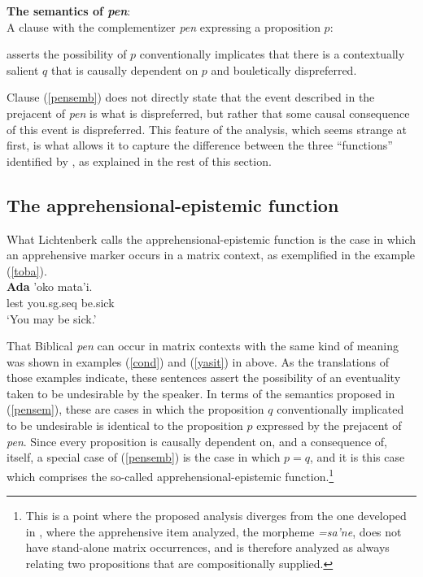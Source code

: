 \documentclass[output=paper,colorlinks,citecolor=brown]{langscibook}
\begin{document}
\ea
\label{pensem} \textnormal{\textbf{The semantics of \textit{pen}}:} \\
\textnormal{A clause with the complementizer \textit{pen} expressing a proposition $p$:}
\begin{xlist}\itemsep=-1mm
\ex\label{pensema} \textnormal{asserts the possibility of $p$}
\ex\label{pensemb} \textnormal{conventionally implicates that there is a contextually salient $q$ that is causally dependent on $p$ and bouletically dispreferred.}
\end{xlist}
\z

\noindent Clause (\ref{pensemb}) does not directly state that the event described in the prejacent of \textit{pen} is what is dispreferred, but rather that some causal consequence of this event is dispreferred. This feature of the analysis, which  seems strange at first, is  what allows it to capture the difference between the three ``functions'' identified by \citet{lichtenberk95}, as explained in the rest of this section. 

\subsection{The apprehensional-epistemic function}
\label{subsec:appr-epis}
What Lichtenberk calls the apprehensional-epistemic function is the case in which an apprehensive marker occurs in a matrix context, as exemplified in the  example (\ref{toba}). 
\ea
\label{toba}   \\
\gll \textbf{Ada} 'oko mata'i.\\
lest you.{\sc sg.seq} be.sick \phantom{rg}\\

\glt `You may be sick.'
\z

That Biblical  \textit{pen} can occur in matrix contexts with the same kind of meaning was shown in examples (\ref{cond}) and (\ref{yasit}) in  above. As the translations of those examples indicate, these sentences assert the possibility of an eventuality taken to be undesirable by the speaker. In terms of the semantics proposed in (\ref{pensem}), these are cases in which the proposition $q$ conventionally implicated to be undesirable is identical to the proposition $p$ expressed by the prejacent of \textit{pen}. 
Since every proposition is causally dependent on, and a consequence of, itself, a special case of (\ref{pensemb}) is the case in which $p=q$, and it is this case which comprises the so-called apprehensional-epistemic function.\footnote{This is a point where the proposed analysis diverges from the one developed in \cite{anderbois21}, where the apprehensive item analyzed, the  morpheme \textit{=sa'ne}, does not have stand-alone matrix occurrences, and is therefore analyzed as always relating two propositions that are compositionally supplied.}
\end{document}
